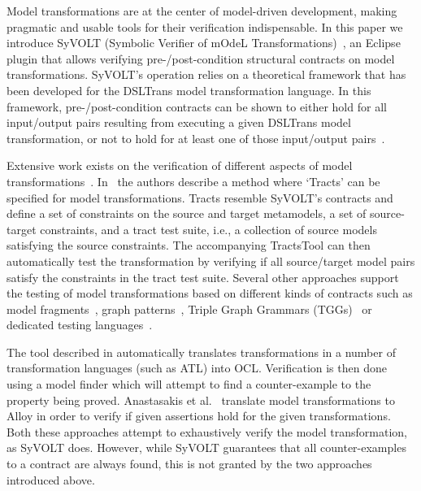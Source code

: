 Model transformations are at the center of model-driven development, making
pragmatic and usable tools for their verification indispensable. In this paper
we introduce SyVOLT (Symbolic Verifier of mOdeL Transformations)~\cite{syvolt},
an Eclipse plugin that allows verifying pre-/post-condition structural
contracts on model transformations. SyVOLT's operation relies on a theoretical framework
that has been developed for the DSLTrans model transformation language. In this
framework, pre-/post-condition contracts can be shown to either hold for all
input/output pairs resulting from executing a given DSLTrans model
transformation, or not to hold for at least one of those input/output
pairs~\cite{Lucio2014}.


Extensive work exists on the verification of different aspects of model
transformations~\cite{AmraniLSCDVTC12}. In~\cite{Vallecillo2012} the
authors describe a method where `Tracts' can be specified for model
transformations. Tracts resemble SyVOLT's contracts and define a set
of constraints on the source and target metamodels, a set of source-target constraints, and a tract test suite, i.e., a collection of source models
satisfying the source constraints. The accompanying TractsTool can then
automatically test the transformation by verifying if all source/target model
pairs satisfy the constraints in the tract test suite.
Several other approaches support the testing of model transformations based
on different kinds of contracts such as model fragments~\cite{Mottu2008}, graph
patterns~\cite{Guerra12,BaloghBCGHMPPRVa10}, Triple Graph Grammars (TGGs)~\cite{WieberAS14} or dedicated testing
languages~\cite{Garcia-Dominguez11}. 

The tool described in \cite{Buettner2013} automatically translates
transformations in a number of transformation languages (such as ATL) into OCL. Verification is then
done using a model finder which will attempt to find a counter-example to the
property being proved. Anastasakis et al.~\cite{Anastasakis07}
translate model transformations to Alloy in order to verify if given
assertions hold for the given transformations. Both these
approaches attempt to exhaustively verify the model transformation, as SyVOLT
does. However, while SyVOLT guarantees that all counter-examples to a contract
are always found, this is not granted by the two approaches introduced above.

